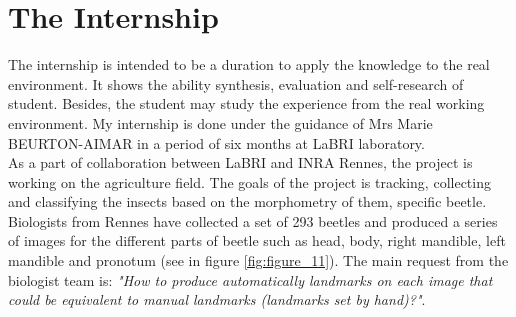\section{The Internship}
The internship is intended to be a duration to apply the knowledge to the real environment. It shows the ability synthesis, evaluation and self-research of student. Besides, the student may study the experience from the real working environment. My internship is done under the guidance of Mrs Marie BEURTON-AIMAR in a period of six months at LaBRI laboratory.\\[0.2cm]
As a part of collaboration between LaBRI and INRA Rennes, the project is working on the agriculture field. The goals of the project is tracking, collecting and classifying the insects based on the morphometry of them, specific beetle. Biologists from Rennes have collected a set of 293 beetles and produced a series of images for the different parts of beetle such as head, body, right mandible, left mandible and pronotum (see in figure \ref{fig:figure_11}). The main request from the biologist team is: \textit{"How to produce automatically landmarks on each image that could be equivalent to manual landmarks (landmarks set by hand)?"}.

